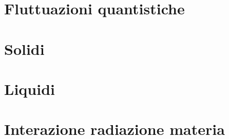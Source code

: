 \chapter{Fluttuazioni quantistiche}



\chapter{Solidi}




\chapter{Liquidi}






\chapter{Interazione radiazione materia}



 


